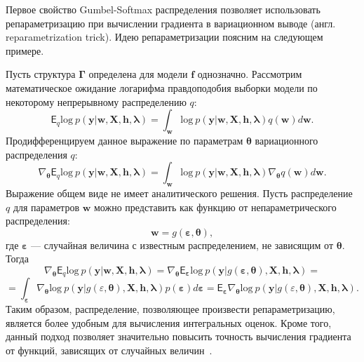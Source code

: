 Первое свойство Gumbel-Softmax распределения позволяет использовать репараметризацию при вычислении градиента в вариационном выводе (англ. reparametrization trick). 
Идею репараметризации поясним на следующем примере.
\begin{example} Пусть структура $\boldsymbol{\Gamma}$ определена для модели $\mathbf{f}$ однозначно. Рассмотрим математическое ожидание логарифма правдоподобия выборки модели по некоторому непрерывному распределению $q$:
\[
    \mathsf{E}_q \text{log}~p(\mathbf{y}|\mathbf{w}, \mathbf{X}, \mathbf{h}, \boldsymbol{\lambda})=  \int_{\mathbf{w}} \text{log}~p(\mathbf{y}|\mathbf{w}, \mathbf{X}, \mathbf{h}, \boldsymbol{\lambda})q(\mathbf{w})d\mathbf{w}.
\]
Продифференцируем данное выражение по параметрам $\boldsymbol{\theta}$ вариационного распределения $q$:
\[
    \nabla_{\boldsymbol{\theta}} \mathsf{E}_q \text{log}~p(\mathbf{y}|\mathbf{w}, \mathbf{X}, \mathbf{h}, \boldsymbol{\lambda}) = 
\int_{\mathbf{w}}  \text{log}~p(\mathbf{y}|\mathbf{w}, \mathbf{X}, \mathbf{h}, \boldsymbol{\lambda})\nabla_{\boldsymbol{\theta}}q(\mathbf{w})d\mathbf{w}.
\]
Выражение общем виде не имеет аналитического решения. Пусть распределение $q$ для параметров $\mathbf{w}$ можно представить как функцию от непараметрического распределения:
\[
    \mathbf{w} = g(\boldsymbol{\varepsilon}, \boldsymbol{\theta}),
\]
где $\boldsymbol{\varepsilon}$ --- случайная величина с известным распределением, не зависящим от $\boldsymbol{\theta}$.
Тогда 
\[
 \nabla_{\boldsymbol{\theta}} \mathsf{E}_q \text{log}~p(\mathbf{y}|\mathbf{w}, \mathbf{X}, \mathbf{h}, \boldsymbol{\lambda}) = \nabla_{\boldsymbol{\theta}} \mathsf{E}_{\boldsymbol{\varepsilon}} \text{log}~p(\mathbf{y}|g(\boldsymbol{\varepsilon}, \boldsymbol{\theta}), \mathbf{X}, \mathbf{h}, \boldsymbol{\lambda}) =
\]
\[= \int_{\boldsymbol{\varepsilon}}\nabla_{\boldsymbol{\theta}} \text{log}~p(\mathbf{y}|g(\varepsilon,\boldsymbol{\theta}), \mathbf{X}, \mathbf{h},\boldsymbol{\lambda}) p(\boldsymbol{\varepsilon}) d\boldsymbol{\varepsilon}=\mathsf{E}_{\boldsymbol{\varepsilon}} \nabla_{\boldsymbol{\theta}} \text{log}~p(\mathbf{y}|g(\varepsilon, \boldsymbol{\theta}), \mathbf{X}, \mathbf{h}, \boldsymbol{\lambda}).\]
Таким образом, распределение, позволяющее произвести репараметризацию, является более удобным для вычисления интегральных оценок.
Кроме того, данный подход позволяет значительно повысить точность вычисления градиента от функций, зависящих от случайных величин~\cite{reparametrization}.
\end{example}


